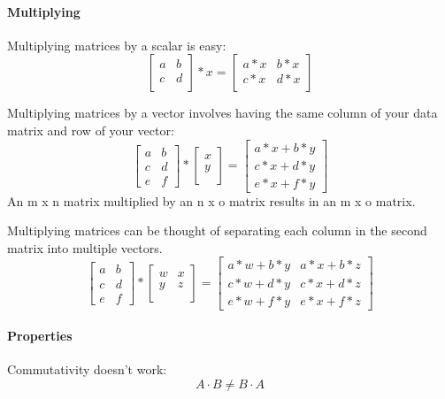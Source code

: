 \documentclass{article}
\begin{document}
\paragraph{Multiplying}
Multiplying matrices by a scalar is easy:
$$
\begin{bmatrix} a & b \\ c & d \\ \end{bmatrix} * x = \begin{bmatrix} a*x & b*x \\ c*x & d*x \\ \end{bmatrix}
$$

Multiplying matrices by a vector involves having the same column of your data matrix and row of your vector:
$$
\begin{bmatrix} a & b \\ c & d \\ e & f \end{bmatrix} * \begin{bmatrix} x \\ y \\ \end{bmatrix} = \begin{bmatrix} a*x + b*y \\c*x + d*y \\ e*x + f*y \end{bmatrix}
$$
An m x n matrix multiplied by an n x o matrix results in an m x o matrix.

Multiplying matrices can be thought of separating each column in the second matrix into multiple vectors.
$$
\begin{bmatrix} a & b \\ c & d \\ e & f \end{bmatrix} * \begin{bmatrix} w & x \\ y & z \\ \end{bmatrix} = \begin{bmatrix} a*w + b*y & a*x + b*z \\ c*w + d*y & c*x + d*z \\ e*w + f*y & e*x + f*z \end{bmatrix}
$$

\paragraph{Properties}
Commutativity doesn't work: 
$$
 A \cdot B \neq B \cdot A
$$
\end{document}
